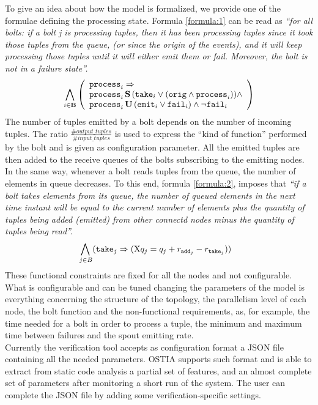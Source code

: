 To give an idea about how the model is formalized, we provide one of the formulae defining the processing state. Formula \ref{formula:1} can be read as \textit{``for all bolts: if a bolt j is processing tuples, then it has been processing tuples since it took those tuples from the queue, (or since the origin of the events), and it will keep processing those tuples until it will either emit them or fail. Moreover, the bolt is not in a failure state''.}
\begin{align}
%
\bigwedge_{
	i \in \mathbf{B} } 
\left( 
\begin{array}{l}
\p{i} \Rightarrow \\
\p{i} \, \Snc \, ( \ta{i} \lor (\ori \land \p{i})) \land \\
\p{i} \, \U \, (\e{i} \lor \f{i}) \land \lnot \f{i} 
\end{array}
\right) \label{formula:1} 
%
\end{align}
The number of tuples emitted by a bolt depends on the number of incoming tuples. The ratio $\frac{\#output\_tuples}{\#input\_tuples}$ is used to express the ``kind of function''  performed by the bolt and is given as configuration parameter. 
All the emitted tuples are then added to the receive queues of the bolts subscribing to the emitting nodes.
In the same way, whenever a bolt reads tuples from the queue, the number of elements in queue decreases. To this end, formula \ref{formula:2}, imposes that \textit{``if a bolt takes elements from its queue, the number of queued elements in the next time instant will be equal to the current number of elements plus the quantity of tuples being added (emitted) from other connectd nodes minus the quantity of tuples being read''.}
\begin{align}
%
\bigwedge_{
	\begin{subarray}{c}
	\,j \in B
	\end{subarray}
} &( \ta{j}{}  \Rightarrow (\aX q_j = q_j + \ra{j} - \rt{j} )) \label{formula:2}
%
\end{align}
These functional constraints are fixed for all the nodes and not configurable.
What is configurable and can be tuned changing the parameters of the model is everything concerning the structure of the topology, the parallelism level of each node, the bolt function and the non-functional requirements, as, for example, the time needed for a bolt in order to process a tuple, the minimum and maximum time between failures and the spout emitting rate.\\

Currently the verification tool accepts as configuration format a JSON file containing all the needed parameters.
OSTIA supports such format and is able to extract from static code analysis a partial set of features, and an almost complete set of parameters after monitoring a short run of the system. The user can complete the JSON file by adding some verification-specific settings.



